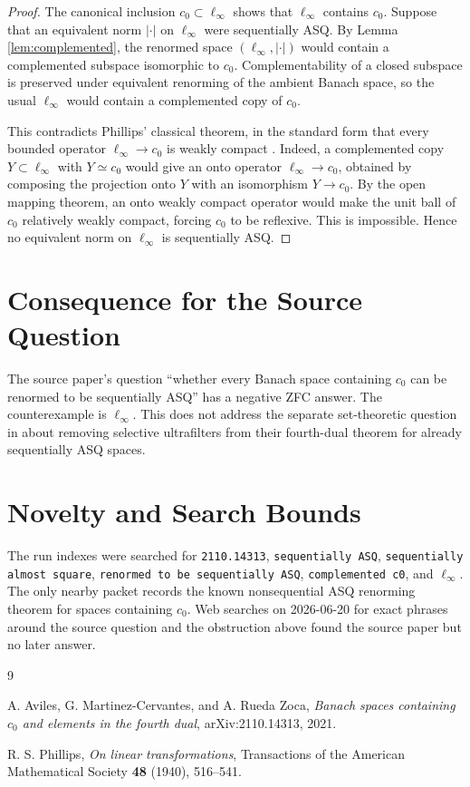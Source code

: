 \documentclass[11pt]{article}
\begin{document}
\begin{proof}
The canonical inclusion \(c_0\subset\ell_\infty\) shows that
\(\ell_\infty\) contains \(c_0\).  Suppose that an equivalent norm
\(|\cdot|\) on \(\ell_\infty\) were sequentially ASQ.  By Lemma
\ref{lem:complemented}, the renormed space \((\ell_\infty,|\cdot|)\) would
contain a complemented subspace isomorphic to \(c_0\).  Complementability of a
closed subspace is preserved under equivalent renorming of the ambient Banach
space, so the usual \(\ell_\infty\) would contain a complemented copy of
\(c_0\).

This contradicts Phillips' classical theorem, in the standard form that every
bounded operator \(\ell_\infty\to c_0\) is weakly compact \cite{Phillips}.
Indeed, a complemented copy \(Y\subset \ell_\infty\) with \(Y\simeq c_0\)
would give an onto operator \(\ell_\infty\to c_0\), obtained by composing the
projection onto \(Y\) with an isomorphism \(Y\to c_0\).  By the open mapping
theorem, an onto weakly compact operator would make the unit ball of \(c_0\)
relatively weakly compact, forcing \(c_0\) to be reflexive.  This is impossible.
Hence no equivalent norm on \(\ell_\infty\) is sequentially ASQ.
\end{proof}

\section*{Consequence for the Source Question}

The source paper's question ``whether every Banach space containing \(c_0\)
can be renormed to be sequentially ASQ'' has a negative ZFC answer.  The
counterexample is \(\ell_\infty\).  This does not address the separate
set-theoretic question in \cite{AMRZ} about removing selective ultrafilters
from their fourth-dual theorem for already sequentially ASQ spaces.

\section*{Novelty and Search Bounds}

The run indexes were searched for \texttt{2110.14313}, \texttt{sequentially
ASQ}, \texttt{sequentially almost square}, \texttt{renormed to be
sequentially ASQ}, \texttt{complemented c0}, and \(\ell_\infty\).  The only
nearby packet records the known nonsequential ASQ renorming theorem for spaces
containing \(c_0\).  Web searches on 2026-06-20 for exact phrases around the
source question and the obstruction above found the source paper but no later
answer.

\begin{thebibliography}{9}

A. Aviles, G. Martinez-Cervantes, and A. Rueda Zoca,
\emph{Banach spaces containing \(c_0\) and elements in the fourth dual},
arXiv:2110.14313, 2021.

R. S. Phillips,
\emph{On linear transformations},
Transactions of the American Mathematical Society \textbf{48} (1940),
516--541.

\end{thebibliography}
\end{document}
